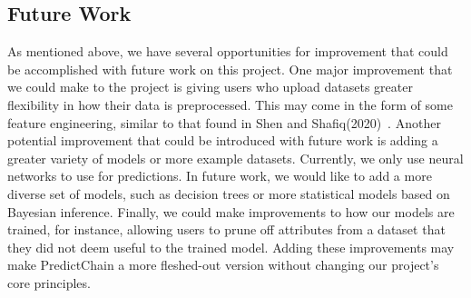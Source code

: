 \documentclass{ledger}
\begin{document}
\subsection{Future Work}

As mentioned above, we have several opportunities for improvement that could be accomplished with future work on this project.  One major improvement that we could make to the project is giving users who upload datasets greater flexibility in how their data is preprocessed.  This may come in the form of some feature engineering, similar to that found in Shen and Shafiq(2020)~\cite{deepPrediction}.  Another potential improvement that could be introduced with future work is adding a greater variety of models or more example datasets.  Currently, we only use neural networks to use for predictions.  In future work, we would like to add a more diverse set of models, such as decision trees or more statistical models based on Bayesian inference.  Finally, we could make improvements to how our models are trained, for instance, allowing users to prune off attributes from a dataset that they did not deem useful to the trained model.  Adding these improvements may make PredictChain a more fleshed-out version without changing our project's core principles.

\ledgernotes












\end{document}
